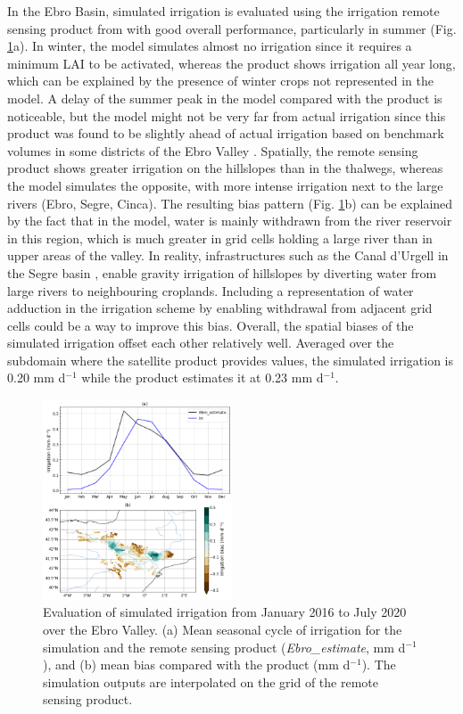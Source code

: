 In the Ebro Basin, simulated irrigation is evaluated using the irrigation remote sensing product from \cite{dari_regional_2023} with good overall performance, particularly in summer (Fig. \ref{fig:irrig_eval}a).
In winter, the model simulates almost no irrigation since it requires a minimum LAI to be activated, whereas the product shows irrigation all year long, which can be explained by the presence of winter crops not represented in the model.
A delay of the summer peak in the model compared with the product is noticeable, but the model might not be very far from actual irrigation since this product was found to be slightly ahead of actual irrigation based on benchmark volumes in some districts of the Ebro Valley \citep[Fig. 5 in ][]{dari_regional_2023}.
Spatially, the remote sensing product shows greater irrigation on the hillslopes than in the thalwegs, whereas the model simulates the opposite, with more intense irrigation next to the large rivers (Ebro, Segre, Cinca).
The resulting bias pattern (Fig. \ref{fig:irrig_eval}b) can be explained by the fact that in the model, water is mainly withdrawn from the river reservoir in this region, which is much greater in grid cells holding a large river than in upper areas of the valley. In reality, infrastructures such as the Canal d'Urgell in the Segre basin \citep{farran_urgell_2024}, enable gravity irrigation of hillslopes by diverting water from large rivers to neighbouring croplands. Including a representation of water adduction in the irrigation scheme by enabling withdrawal from adjacent grid cells could be a way to improve this bias.
Overall, the spatial biases of the simulated irrigation offset each other relatively well. Averaged over the subdomain where the satellite product provides values, the simulated irrigation is 0.20 mm d$^{-1}$ while the product estimates it at 0.23 mm d$^{-1}$.

\begin{figure}[htbp]
    \centering
    \includegraphics[width=0.5\textwidth]{images/chap4/f04.png}
    \caption{Evaluation of simulated irrigation from January 2016 to July 2020 over the Ebro Valley. (a) Mean seasonal cycle of irrigation for the \irr simulation and the remote sensing product (\textit{Ebro\_estimate}, mm d$^{-1}$), and (b) mean bias compared with the product (mm d$^{-1}$). The simulation outputs are interpolated on the grid of the remote sensing product.}
    \label{fig:irrig_eval}
\end{figure}

